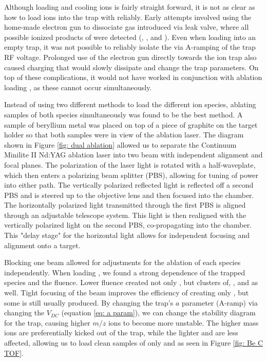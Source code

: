 Although loading and cooling  ions is fairly straight forward, it is not as clear as how to load  ions into the trap with  reliably. Early attempts involved using the home-made electron gun to dissociate  gas introduced via leak valve, where all possible ionized products of  were detected (, , and ). Even when loading into an empty trap, it was not possible to reliably isolate the  via A-ramping of the trap RF voltage. Prolonged use of the electron gun directly towards the ion trap also caused charging that would slowly dissipate and change the trap parameters. On top of these complications, it would not have worked in conjunction with ablation loading , as these cannot occur simultaneously.

Instead of using two different methods to load the different ion species, ablating samples of both species simultaneously was found to be the best method. A sample of beryllium metal was placed on top of a piece of graphite on the target holder so that both samples were in view of the ablation laser. The diagram shown in Figure \ref{fig: dual ablation} allowed us to separate the Continuum Minilite II Nd:YAG ablation laser into two beam with independent alignment and focal planes. The polarization of the laser light is rotated with a half-waveplate, which then enters a polarizing beam splitter (PBS), allowing for tuning of power into either path. The vertically polarized reflected light is reflected off a second PBS and is steered up to the objective lens and then focused into the chamber. The horizontally polarized light transmitted through the first PBS is aligned through an adjustable telescope system. This light is then realigned with the vertically polarized light on the second PBS, co-propagating into the chamber. This "delay stage" for the horizontal light allows for independent focusing and alignment onto a target.

Blocking one beam allowed for adjustments for the ablation of each species independently. When loading , we found a strong dependence of the trapped species and the fluence. Lower fluence created not only , but clusters of, , and  as well. Tight focusing of the beam improves the efficiency of creating only , but some  is still usually produced. By changing the trap's $a$ parameter (A-ramp) via changing the $V_{DC}$ (equation \ref{eq: a param}), we can change the stability diagram for the trap, causing higher $m/z$ ions to become more unstable. The higher mass  ions are preferentially kicked out of the trap, while the lighter  and  are less affected, allowing us to load clean samples of only  and  as seen in Figure \ref{fig: Be C TOF}.


